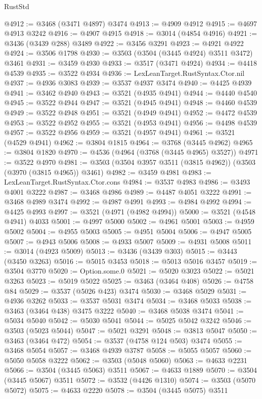 \begin{lexlean}{RustStd}
\begin{coremodule}
@4912 := @3468 (@3471 @4897) @3474
@4913 := @4909 @4912
@4915 := @4697 @4913 @3242
@4916 := @4907 @4915
@4918 := @3014 (@4854 @4916)
@4921 := @3436 (@3439 @288) @3489
@4922 := @3456 @3291
@4923 := @4921 @4922
@4924 := @3506 @1798
@4930 := @3503 (@3504 (@3445 @4924) @3511 @3472) @3461
@4931 := @3459 @4930
@4933 := @3517 (@3471 @4924)
@4934 := @4418 @4539
@4935 := @3522 @4934
@4936 := LexLeanTarget.RustSyntax.Ctor.nil
@4937 := @4936 @3083
@4939 := @3537 @4937 @3474
@4940 := @4425 @4939
@4941 := @3462 @4940
@4943 := @3521 (@4935 @4941)
@4944 := @4440 @4540
@4945 := @3522 @4944
@4947 := @3521 (@4945 @4941)
@4948 := @4460 @4539
@4949 := @3522 @4948
@4951 := @3521 (@4949 @4941)
@4952 := @4472 @4539
@4953 := @3522 @4952
@4955 := @3521 (@4953 @4941)
@4956 := @4498 @4539
@4957 := @3522 @4956
@4959 := @3521 (@4957 @4941)
@4961 := @3521 (@4529 @4941)
@4962 := @3804 @1815
@4964 := @3768 (@3445 @4962)
@4965 := @3804 @1820
@4970 := @4536 (@4964 (@3768 (@3445 @4965) @3527))
@4971 := @3522 @4970
@4981 := @3503 (@3504 @3957 @3511 (@3815 @4962)) (@3503 (@3970 (@3815 @4965)) @3461)
@4982 := @3459 @4981
@4983 := LexLeanTarget.RustSyntax.Ctor.cons
@4984 := @3537 @4983
@4986 := @3493 @4001 @3222
@4987 := @3468 @4986
@4989 := @4487 @4051 @3222
@4991 := @3468 @4989 @3474
@4992 := @4987 @4991
@4993 := @4984 @4992
@4994 := @4425 @4993
@4997 := @3521 (@4971 (@4982 @4994))
@5000 := @3521 (@4548 @4941) @4033
@5001 := @4997 @5000
@5002 := @4961 @5001
@5003 := @4959 @5002
@5004 := @4955 @5003
@5005 := @4951 @5004
@5006 := @4947 @5005
@5007 := @4943 @5006
@5008 := @4933 @5007
@5009 := @4931 @5008
@5011 := @3014 (@4923 @5009)
@5013 := @3436 (@3439 @303)
@5015 := @3443 (@3450 @3263)
@5016 := @5015 @3453
@5018 := @5013 @5016 @3457
@5019 := @3504 @3770
@5020 := Option.some.{0}
@5021 := @5020 @3023
@5022 := @5021 @3263
@5023 := @5019 @5022
@5025 := @3463 (@3464 @408)
@5026 := @4758 @84
@5029 := @3537 (@5026 @423) @3474
@5030 := @3468 @5029
@5031 := @4936 @3262
@5033 := @3537 @5031 @3474
@5034 := @3468 @5033
@5038 := @3463 (@3464 @438) @3475 @3222
@5040 := @3468 @5038 @3474
@5041 := @5034 @5040
@5042 := @5030 @5041
@5044 := @5025 @5042 @3242
@5046 := @3503 (@5023 @5044)
@5047 := @5021 @3291
@5048 := @3813 @5047
@5050 := @3463 (@3464 @472)
@5054 := @3537 (@4758 @124 @503) @3474
@5055 := @3468 @5054
@5057 := @3468 @4939 @3787
@5058 := @5055 @5057
@5060 := @5050 @5058 @3222
@5062 := @3503 (@5048 @5060)
@5063 := @4633 @2231
@5066 := @3504 (@3445 @5063) @3511
@5067 := @4633 @1889
@5070 := @3504 (@3445 @5067) @3511
@5072 := @3532 (@4426 @1310)
@5074 := @3503 (@5070 @5072)
@5075 := @4633 @2220
@5078 := @3504 (@3445 @5075) @3511

\end{coremodule}
\end{lexlean}
